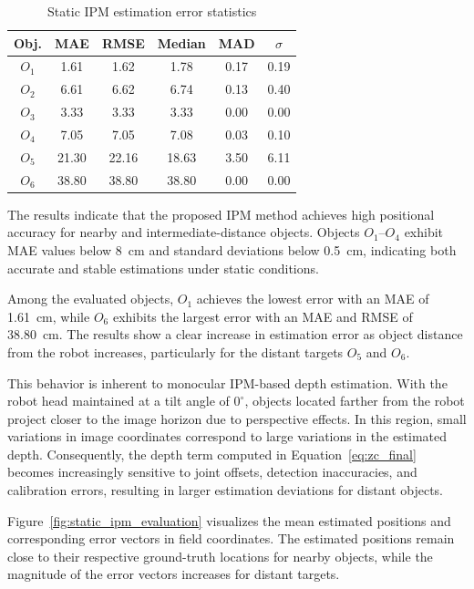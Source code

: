 \documentclass[journal]{IAENGtran}
\begin{document}
\begin{table}[h]
\centering
\footnotesize
\caption{Static IPM estimation error statistics}
\label{tab:static_results}
\begin{tabular}{c c c c c c}
\toprule
\textbf{Obj.} &
\textbf{MAE} &
\textbf{RMSE} &
\textbf{Median} &
\textbf{MAD} &
\textbf{$\sigma$} \\
\midrule
$O_1$ & 1.61 & 1.62 & 1.78 & 0.17 & 0.19 \\
$O_2$ & 6.61 & 6.62 & 6.74 & 0.13 & 0.40 \\
$O_3$ & 3.33 & 3.33 & 3.33 & 0.00 & 0.00 \\
$O_4$ & 7.05 & 7.05 & 7.08 & 0.03 & 0.10 \\
$O_5$ & 21.30 & 22.16 & 18.63 & 3.50 & 6.11 \\
$O_6$ & 38.80 & 38.80 & 38.80 & 0.00 & 0.00 \\
\bottomrule
\end{tabular}
\end{table}

The results indicate that the proposed IPM method achieves high positional
accuracy for nearby and intermediate-distance objects. Objects $O_1$--$O_4$
exhibit MAE values below 8~cm and standard deviations below 0.5~cm, indicating
both accurate and stable estimations under static conditions.

Among the evaluated objects, $O_1$ achieves the lowest error with an MAE of
1.61~cm, while $O_6$ exhibits the largest error with
an MAE and RMSE of 38.80~cm. The results show a clear increase in estimation
error as object distance from the robot increases, particularly for the
distant targets $O_5$ and $O_6$.

This behavior is inherent to monocular IPM-based depth estimation.
With the robot head maintained at a tilt angle of $0^\circ$, objects located
farther from the robot project closer to the image horizon due to perspective
effects. In this region, small variations in image coordinates correspond to
large variations in the estimated depth. Consequently, the depth term computed
in Equation~\ref{eq:zc_final} becomes increasingly sensitive to joint offsets,
detection inaccuracies, and calibration errors, resulting in larger
estimation deviations for distant objects.

Figure~\ref{fig:static_ipm_evaluation} visualizes the mean estimated positions and
corresponding error vectors in field coordinates. The estimated positions remain
close to their respective ground-truth locations for nearby objects, while the
magnitude of the error vectors increases for distant targets.
\end{document}
